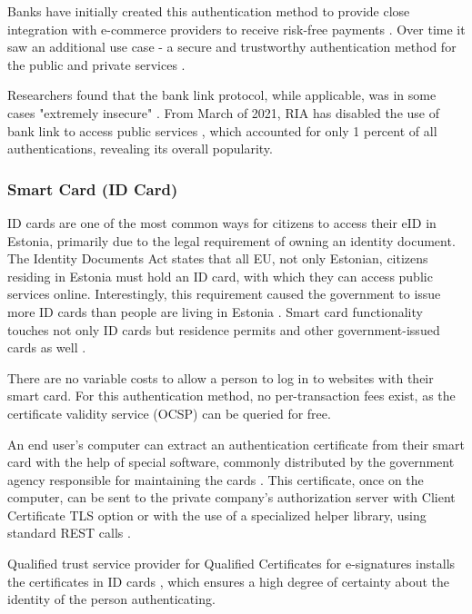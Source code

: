 Banks have initially created this authentication method to provide close integration with e-commerce providers to receive risk-free payments \cite{kerem2003internet}. Over time it saw an additional use case - a secure and trustworthy authentication method for the public and private services \cite{sebbanklink}.

Researchers found that the bank link protocol, while applicable, was in some cases "extremely insecure" \cite{banklinksecurityanalysis}. From March of 2021, RIA has disabled the use of {bank link} to access public services \cite{ria-deprecates-bank-link}, which accounted for only 1 percent of all authentications, revealing its overall popularity.

\subsubsection{Smart Card (ID Card)}

ID cards are one of the most common ways for citizens to access their eID in Estonia, primarily due to the legal requirement of owning an identity document. The Identity Documents Act \cite{eelaw-idcard} states that all EU, not only Estonian, citizens residing in Estonia must hold an ID card, with which they can access public services online. Interestingly, this requirement caused the government to issue more ID cards than people are living in Estonia \cite{ria-idee,statee-population}. Smart card functionality touches not only ID cards but residence permits and other government-issued cards as well \cite{eulaw-eidas-notified}.

There are no variable costs to allow a person to log in to websites with their smart card. For this authentication method, no per-transaction fees exist, as the certificate validity service (OCSP) \cite{rfc6960} can be queried for free.

An end user's computer can extract an authentication certificate from their smart card with the help of special software, commonly distributed by the government agency responsible for maintaining the cards \cite{ria-idee}. This certificate, once on the computer, can be sent to the private company's authorization server with Client Certificate TLS option \cite{rfc8446} or with the use of a specialized helper library, using standard REST calls \cite{ria-webeid}.

Qualified trust service provider for Qualified Certificates for e-signatures installs the certificates in ID cards \cite{eu-trustservices}, which ensures a high degree of certainty about the identity of the person authenticating.

